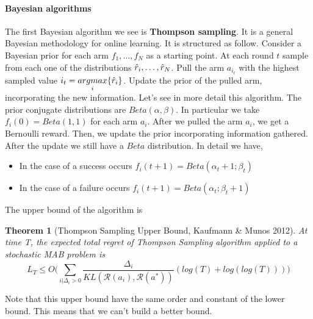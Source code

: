 \documentclass[main.tex]{subfiles}
\newtheorem{theorem}{Theorem}[section]
\begin{document}
\paragraph{Bayesian algorithms}
The first Bayesian algorithm we see is \textbf{Thompson sampling}. It is a general Bayesian methodology for online learning. It is structured as follow.
Consider a Bayesian prior for each arm $f_1,\dots,f_N$ as a starting point. At each round $t$ sample from each one of the distributions $\Hat{r}_i, \dots, \Hat{r}_N$. Pull the arm $a_{i_t}$ with the highest sampled value $i_t = \underset{i}{argmax} \{ \Hat{r}_i \}$. Update the prior of the pulled arm, incorporating the new information.
Let's see in more detail this algorithm. The prior conjugate distributions are $Beta(\alpha, \beta)$. In particular we take $f_i(0)=Beta(1,1)$ for each arm $a_i$. After we pulled the arm $a_i$, we get a Bernoulli reward. Then, we update the prior incorporating information gathered. After the update we still have a $Beta$ distribution. In detail we have,
\begin{itemize}
    \item In the case of a success occurs $f_i(t + 1) = Beta(\alpha_t + 1; \beta_t)$
    \item In the case of a failure occurs $f_i(t + 1) = Beta(\alpha_t; \beta_t + 1)$
\end{itemize}
The upper bound of the algorithm is
\begin{theorem}[Thompson Sampling Upper Bound, Kaufmann \& Munos 2012]
    At time T, the expected total regret of Thompson Sampling algorithm applied
    to a stochastic MAB problem is
    \begin{equation*}
        L_T \leq O \Bigg( \sum_{i|\Delta_i > 0} \frac{\Delta_i}{KL(\mathcal{R}(a_i),\mathcal{R}(a^*))} (log(T) + log(log(T))) \Bigg)
    \end{equation*}
\end{theorem}
Note that this upper bound have the same order and constant of the lower bound. This means that we can't build a better bound.
\end{document}
